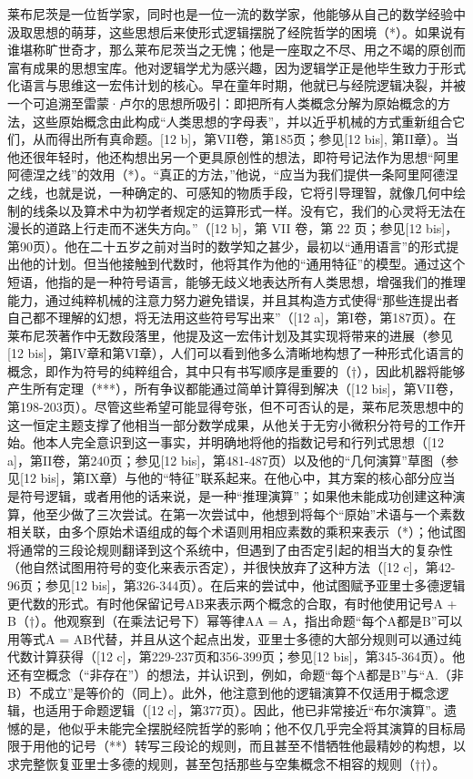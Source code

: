 莱布尼茨是一位哲学家，同时也是一位一流的数学家，他能够从自己的数学经验中汲取思想的萌芽，这些思想后来使形式逻辑摆脱了经院哲学的困境（*）。如果说有谁堪称旷世奇才，那么莱布尼茨当之无愧；他是一座取之不尽、用之不竭的原创而富有成果的思想宝库。他对逻辑学尤为感兴趣，因为逻辑学正是他毕生致力于形式化语言与思维这一宏伟计划的核心。早在童年时期，他就已与经院逻辑决裂，并被一个可追溯至雷蒙·卢尔的思想所吸引：即把所有人类概念分解为原始概念的方法，这些原始概念由此构成“人类思想的字母表”，并以近乎机械的方式重新组合它们，从而得出所有真命题。{[}12 b{]}，第VII卷，第185页；参见{[}12 bis{]}, 第II章）。当他还很年轻时，他还构想出另一个更具原创性的想法，即符号记法作为思想“阿里阿德涅之线”的效用（*）。“真正的方法，”他说，“应当为我们提供一条阿里阿德涅之线，也就是说，一种确定的、可感知的物质手段，它将引导理智，就像几何中绘制的线条以及算术中为初学者规定的运算形式一样。没有它，我们的心灵将无法在漫长的道路上行走而不迷失方向。”（{[}12 b{]}，第 VII 卷，第 22 页；参见{[}12 bis{]}，第90页）。他在二十五岁之前对当时的数学知之甚少，最初以“通用语言”的形式提出他的计划。但当他接触到代数时，他将其作为他的“通用特征”的模型。通过这个短语，他指的是一种符号语言，能够无歧义地表达所有人类思想，增强我们的推理能力，通过纯粹机械的注意力努力避免错误，并且其构造方式使得“那些连提出者自己都不理解的幻想，将无法用这些符号写出来”（{[}12 a{]}，第I卷，第187页）。在莱布尼茨著作中无数段落里，他提及这一宏伟计划及其实现将带来的进展（参见{[}12 bis{]}，第IV章和第VI章），人们可以看到他多么清晰地构想了一种形式化语言的概念，即作为符号的纯粹组合，其中只有书写顺序是重要的（†），因此机器将能够产生所有定理（***），所有争议都能通过简单计算得到解决（{[}12 bis{]}，第VII卷，第198-203页）。尽管这些希望可能显得夸张，但不可否认的是，莱布尼茨思想中的这一恒定主题支撑了他相当一部分数学成果，从他关于无穷小微积分符号的工作开始。他本人完全意识到这一事实，并明确地将他的指数记号和行列式思想（{[}12 a{]}，第II卷，第240页；参见{[}12 bis{]}，第481-487页）以及他的“几何演算”草图（参见{[}12 bis{]}，第IX章）与他的“特征”联系起来。在他心中，其方案的核心部分应当是符号逻辑，或者用他的话来说，是一种“推理演算”；如果他未能成功创建这种演算，他至少做了三次尝试。在第一次尝试中，他想到将每个“原始”术语与一个素数相关联，由多个原始术语组成的每个术语则用相应素数的乘积来表示（*）；他试图将通常的三段论规则翻译到这个系统中，但遇到了由否定引起的相当大的复杂性（他自然试图用符号的变化来表示否定），并很快放弃了这种方法（{[}12 c{]}，第42-96页；参见{[}12 bis{]}，第326-344页）。在后来的尝试中，他试图赋予亚里士多德逻辑更代数的形式。有时他保留记号AB来表示两个概念的合取，有时他使用记号A + B（†）。他观察到（在乘法记号下）幂等律AA = A，指出命题“每个A都是B”可以用等式A = AB代替，并且从这个起点出发，亚里士多德的大部分规则可以通过纯代数计算获得（{[}12 c{]}，第229-237页和356-399页；参见{[}12 bis{]}，第345-364页）。他还有空概念（“非存在”）的想法，并认识到，例如，命题“每个A都是B”与“A.（非B）不成立”是等价的（同上）。此外，他注意到他的逻辑演算不仅适用于概念逻辑，也适用于命题逻辑（{[}12 c{]}，第377页）。因此，他已非常接近“布尔演算”。遗憾的是，他似乎未能完全摆脱经院哲学的影响；他不仅几乎完全将其演算的目标局限于用他的记号（**）转写三段论的规则，而且甚至不惜牺牲他最精妙的构想，以求完整恢复亚里士多德的规则，甚至包括那些与空集概念不相容的规则（††）。

